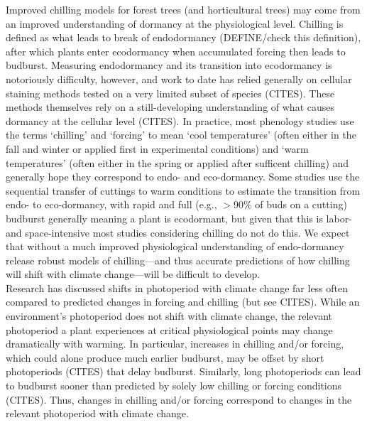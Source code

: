 \documentclass[11pt,letter]{article}
\begin{document}
Improved chilling models for forest trees (and horticultural trees) may come from an improved understanding of dormancy at the physiological level. Chilling is defined as what leads to break of endodormancy (DEFINE/check this definition), after which plants enter ecodormancy when accumulated forcing then leads to budburst. Measuring endodormancy and its transition into ecodormancy is notoriously difficulty, however, and work to date has relied generally on cellular staining methods tested on a very limited subset of species (CITES). These methods themselves rely on a still-developing understanding of what causes dormancy at the cellular level (CITES). In practice, most phenology studies use the terms `chilling' and `forcing' to mean `cool temperatures' (often either in the fall and winter or applied first in experimental conditions) and `warm temperatures' (often either in the spring or applied after sufficent chilling) and generally hope they correspond to endo- and eco-dormancy. Some studies use the sequential transfer of cuttings to warm conditions to estimate the transition from endo- to eco-dormancy, with rapid and full (e.g., $>$90\% of buds on a cutting) budburst generally meaning a plant is ecodormant, but given that this is labor- and space-intensive most studies considering chilling do not do this. We expect that without a much improved physiological understanding of endo-dormancy release robust models of chilling---and thus accurate predictions of how chilling will shift with climate change---will be difficult to develop. \\ %

Research has discussed shifts in photoperiod with climate change far less often compared to predicted changes in forcing and chilling (but see CITES). While an environment's photoperiod does not shift with climate change, the relevant photoperiod a plant experiences at critical physiological points may change dramatically with warming. In particular, increases in chilling and/or forcing, which could alone produce much earlier budburst, may be offset by short photoperiods (CITES) that delay budburst. Similarly, long photoperiods can lead to budburst sooner than predicted by solely low chilling or forcing conditions (CITES). Thus, changes in chilling and/or forcing correspond to changes in the relevant photoperiod with climate change. \\
\end{document}
